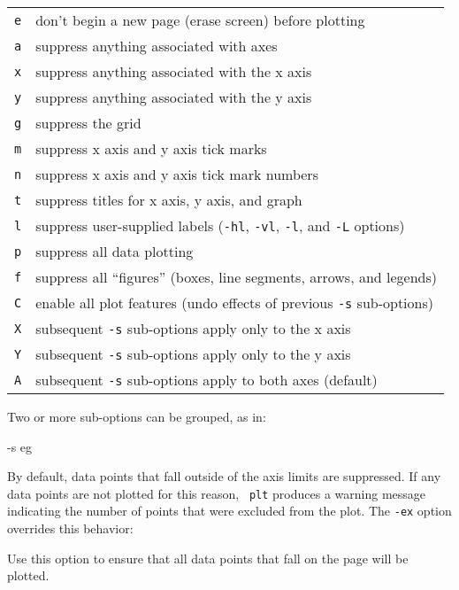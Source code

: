 \documentclass{book}
\begin{document}
\begin{center}
\begin{tabular}{lp{10cm}}
{\tt e} & don't begin a new page (erase screen) before plotting \\
{\tt a} & suppress anything associated with axes \\
{\tt x} & suppress anything associated with the x axis \\
{\tt y} & suppress anything associated with the y axis \\
{\tt g} & suppress the grid \\
{\tt m} & suppress x axis and y axis tick marks \\
{\tt n} & suppress x axis and y axis tick mark numbers \\
{\tt t} & suppress titles for x axis, y axis, and graph \\
{\tt l} & suppress user-supplied labels ({\tt -hl}, {\tt -vl}, {\tt -l},
	 and {\tt -L} options) \\
{\tt p} & suppress all data plotting \\
{\tt f} & suppress all ``figures'' (boxes, line segments, arrows, and
	legends) \\
{\tt C} & enable all plot features (undo effects of previous {\tt -s}
	 sub-options) \\
{\tt X} & subsequent {\tt -s} sub-options apply only to the x axis \\
{\tt Y} & subsequent {\tt -s} sub-options apply only to the y axis \\
{\tt A} & subsequent {\tt -s} sub-options apply to both axes (default)
\end{tabular}
\end{center}

Two or more sub-options can be grouped, as in:

\begin{center}
\begin{boxedverbatim}
-s eg
\end{boxedverbatim}
\end{center}

By default, data points that fall outside of the axis limits are
suppressed.  If any data points are not plotted for this reason, {\tt
plt} produces a warning message indicating the number of points that
were excluded from the plot.  The {\tt -ex} option overrides this behavior:

\begin{description}
%
\item[{\tt -ex}]
Use this option to ensure that all data points that fall on the page will be
plotted.
\end{description}
\end{document}
